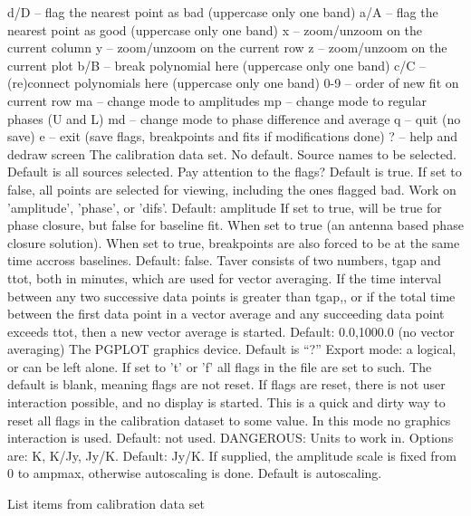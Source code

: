 {{\eightpoint\begintt
  d/D -- flag the nearest point as bad (uppercase only one band)
  a/A -- flag the nearest point as good (uppercase only one band)
  x   -- zoom/unzoom on the current column
  y   -- zoom/unzoom on the current row
  z   -- zoom/unzoom on the current plot
  b/B -- break polynomial here (uppercase only one band)
  c/C -- (re)connect polynomials here (uppercase only one band)
  0-9 -- order of new fit on current row
  ma  -- change mode to amplitudes
  mp  -- change mode to regular phases (U and L)
  md  -- change mode to phase difference and average
  q   -- quit (no save)
  e   -- exit (save flags, breakpoints and fits if modifications done)
  ?   -- help and dedraw screen
\endtt}
The calibration data set.  
No default.
Source names to be selected. 
Default is all sources selected.
Pay attention to the flags? Default is true.
If set to false, all points are selected for viewing, including
the ones flagged bad.
Work on 'amplitude', 'phase', or 'difs'.
Default: amplitude
If set to true, will be true for phase closure, but false for 
baseline fit.  When set to true (an antenna based phase closure 
solution). When set to true, breakpoints are also forced to be at
the same time accross baselines.
Default: false.
Taver consists of two numbers, tgap and ttot, both in minutes,
which are used for vector averaging. If the time interval between
any two successive data points is greater than tgap,, or if the total
time between the first data point in a vector average and any
succeeding data point exceeds ttot, then a new vector average is
started.
Default: 0.0,1000.0 (no vector averaging)
The PGPLOT graphics device.  
Default is ``?''
Export mode: a logical, or can be left alone.
If set to 't' or 'f' all flags in the file are set to such.
The default is blank, meaning flags are not reset. If flags
are reset, there is not user interaction possible, and no display 
is started. This is a quick and dirty way to reset all flags
in the calibration dataset to some value. In this mode no graphics
interaction is used.
Default: not used.
DANGEROUS: Units to work in. Options are: K, K/Jy, Jy/K.
Default: Jy/K.
If supplied, the amplitude scale is fixed from 0 to ampmax,
otherwise autoscaling is done. Default is autoscaling.
\par}
%
\noindent List items from calibration data set
\newline \ 
